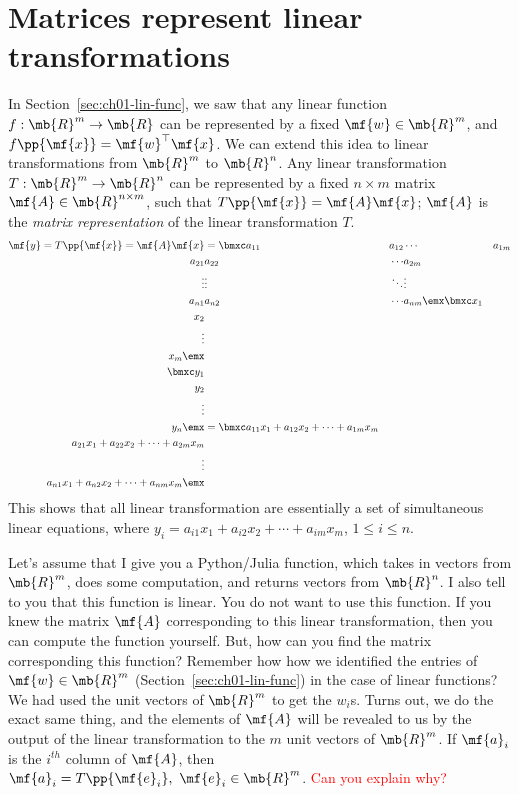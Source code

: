 \section{Matrices represent linear transformations}\label{sec:ch03-mat-lin-trans}
In Section~\ref{sec:ch01-lin-func}, we saw that any linear function $f: \mb{R}^m \to \mb{R}$ can be represented by a fixed $\mf{w} \in \mb{R}^m$, and $f\pp{\mf{x}} = \mf{w}^\top\mf{x}$. We can extend this idea to linear transformations from $\mb{R}^m$ to $\mb{R}^n$. Any linear transformation $T: \mb{R}^m \to \mb{R}^n$ can be represented by a fixed $n \times m$ matrix $\mf{A} \in \mb{R}^{n \times m}$, such that $T\pp{\mf{x}} = \mf{A}\mf{x}$; $\mf{A}$ is the \textit{matrix representation} of the linear transformation $T$.
\begin{equation}
    \begin{split}
        \mf{y} = T\pp{\mf{x}} = \mf{A}\mf{x} &= \bmxc a_{11} & a_{12} & \cdots & a_{1m}\\ a_{21} & a_{22} & \cdots & a_{2m}\\ \vdots & \vdots & \ddots & \vdots\\ a_{n1} & a_{n2} & \cdots & a_{nm} \emx \bmxc x_1 \\ x_2 \\ \vdots \\ x_m\emx \\
        \bmxc y_1 \\ y_2 \\ \vdots \\ y_n \emx &= \bmxc a_{11}x_1 + a_{12}x_2 + \cdots + a_{1m}x_m \\ 
        a_{21}x_1 + a_{22}x_2 + \cdots + a_{2m}x_m \\
        \vdots \\
        a_{n1}x_1 + a_{n2}x_2 + \cdots + a_{nm}x_m\emx 
    \end{split}
    \label{eq:ch03-lin-trans-mat-rep}
\end{equation}
This shows that all linear transformation are essentially a set of simultaneous linear equations, where $y_i = a_{i1}x_1 + a_{i2}x_2 + \cdots + a_{im}x_m$, $1 \leq i \leq n$.

Let's assume that I give you a Python/Julia function, which takes in vectors from $\mb{R}^m$, does some computation, and returns vectors from $\mb{R}^n$. I also tell to you that this function is linear. You do not want to use this function. If you knew the matrix $\mf{A}$ corresponding to this linear transformation, then you can compute the function yourself. But, how can you find the matrix corresponding this function? Remember how how we identified the entries of $\mf{w} \in \mb{R}^m$ (Section~\ref{sec:ch01-lin-func}) in the case of linear functions? We had used the unit vectors of $\mb{R}^m$ to get  the $w_i$s. Turns out, we do the exact same thing, and the elements of $\mf{A}$ will be revealed to us by the output of the linear transformation to the $m$ unit vectors of $\mb{R}^m$. If $\mf{a}_i$ is the $i^{th}$ column of $\mf{A}$, then 
$\mf{a}_i = T\pp{\mf{e}_i}, \,\, \mf{e}_i \in \mb{R}^m$. \textcolor{red}{Can you explain why?}

